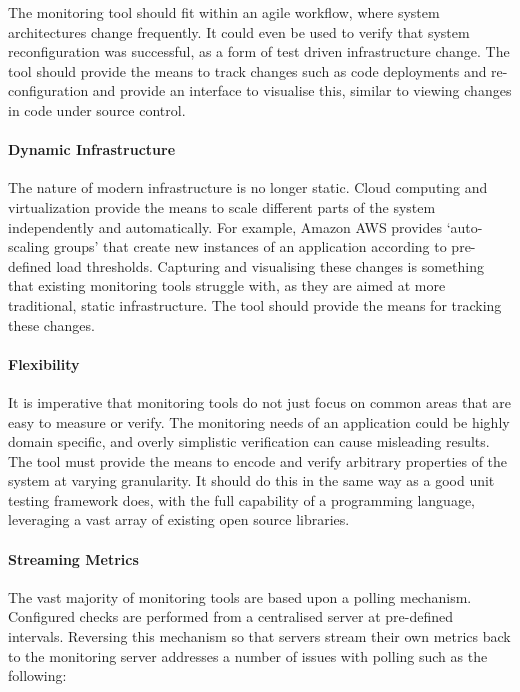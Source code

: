 \documentclass{cshonours}
\begin{document}
The monitoring tool should fit within an agile workflow, where system architectures change frequently. It could even be used to verify that system reconfiguration was successful, as a form of test driven infrastructure change. The tool should provide the means to track changes such as code deployments and re-configuration and provide an interface to visualise this, similar to viewing changes in code under source control.

\paragraph{Dynamic Infrastructure}

The nature of modern infrastructure is no longer static. Cloud computing and virtualization provide the means to scale different parts of the system independently and automatically. For example, Amazon AWS provides `auto-scaling groups' that create new instances of an application according to pre-defined load thresholds. Capturing and visualising these changes is something that existing monitoring tools struggle with, as they are aimed at more traditional, static infrastructure. The tool should provide the means for tracking these changes.

\paragraph{Flexibility}

It is imperative that monitoring tools do not just focus on common areas that are easy to measure or verify. The monitoring needs of an application could be highly domain specific, and overly simplistic verification can cause misleading results. The tool must provide the means to encode and verify arbitrary properties of the system at varying granularity. It should do this in the same way as a good unit testing framework does, with the full capability of a programming language, leveraging a vast array of existing open source libraries.

\paragraph{Streaming Metrics} The vast majority of monitoring tools are based upon a polling mechanism. Configured checks are performed from a centralised server at pre-defined intervals. Reversing this mechanism so that servers stream their own metrics back to the monitoring server addresses a number of issues with polling such as the following:
\end{document}
